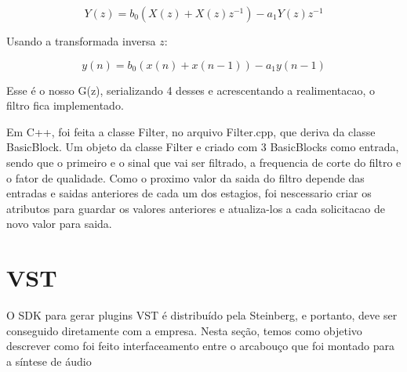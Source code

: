 \documentclass{article}
\begin{document}
\begin{equation}\label{eq:(5)}
Y(z) = b_0(X(z)+X(z)z^{-1})-a_1Y(z)z^{-1}
\end{equation}

Usando a transformada inversa $z$:

\begin{equation}\label{eq:(6)}
y(n)=b_0(x(n)+x(n-1))-a_1 y(n-1)  
\end{equation}


Esse é o nosso G(z), serializando 4 desses e acrescentando a realimentacao, o filtro fica implementado.

Em C++, foi feita a classe Filter, no arquivo Filter.cpp, que deriva da classe BasicBlock. Um objeto da classe Filter e criado com 3 BasicBlocks como entrada, sendo que o primeiro e o sinal que vai ser filtrado, a frequencia de corte do filtro e o fator de qualidade. Como o proximo valor da saida do filtro depende das entradas e saidas anteriores de cada um dos estagios, foi nescessario criar os atributos para guardar os valores anteriores e atualiza-los a cada solicitacao de novo valor para saida.


\section{VST}
O SDK para gerar plugins VST é distribuído pela Steinberg, e portanto, deve 
ser conseguido diretamente com a empresa. Nesta seção, temos como objetivo 
descrever como foi feito interfaceamento entre o arcabouço que foi montado 
para a síntese de áudio


\end{document}
